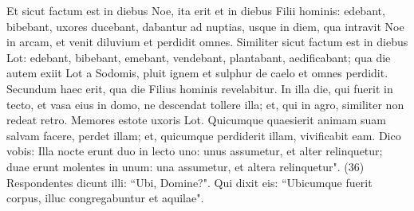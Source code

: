 \begin{biblechapter}
\verse Et sicut factum est in diebus Noe, ita erit et in diebus Filii hominis: 
\verse edebant, bibebant, uxores ducebant, dabantur ad nuptias, usque in diem, qua intravit Noe in arcam, et venit diluvium et perdidit omnes. 
\verse Similiter sicut factum est in diebus Lot: edebant, bibebant, emebant, vendebant, plantabant, aedificabant;  
\verse qua die autem exiit Lot a Sodomis, pluit ignem et sulphur de caelo et omnes perdidit. 
\verse Secundum haec erit, qua die Filius hominis revelabitur. 
\verse In illa die, qui fuerit in tecto, et vasa eius in domo, ne descendat tollere illa; et, qui in agro, similiter non redeat retro. 
\verse Memores estote uxoris Lot. 
\verse Quicumque quaesierit animam suam salvam facere, perdet illam; et, quicumque perdiderit illam, vivificabit eam. 
\verse Dico vobis: Illa nocte erunt duo in lecto uno: unus assumetur, et alter relinquetur; 
\verse duae erunt molentes in unum: una assumetur, et altera relinquetur". (36) 
\verse Respondentes dicunt illi: “Ubi, Domine?". Qui dixit eis: “Ubicumque fuerit corpus, illuc congregabuntur et aquilae". 
\end{biblechapter}

